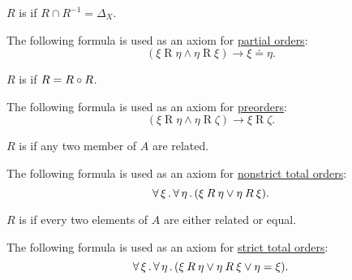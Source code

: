 \begin{definition}
\begin{thmenum}[resume=def:binary_relation]
     \( R \) is  if \( R \cap R^{-1} = \Delta_X \).

    The following formula is used as an axiom for \hyperref[def:partially_ordered_set]{partial orders}:
    \begin{equation}\label{eq:def:binary_relation/antisymmetric}
      (\xi \mathbin{R} \eta \wedge \eta \mathbin{R} \xi) \rightarrow \xi \doteq \eta.
    \end{equation}

     \( R \) is  if \( R = R \mathbin \circ R \).

    The following formula is used as an axiom for \hyperref[def:partially_ordered_set]{preorders}:
    \begin{equation}\label{eq:def:binary_relation/transitive}
      (\xi \mathbin{R} \eta \wedge \eta \mathbin{R} \zeta) \rightarrow \xi \mathbin{R} \zeta.
    \end{equation}

     \( R \) is  if any two member of \( A \) are related.

    The following formula is used as an axiom for \hyperref[def:totally_ordered_set]{nonstrict total orders}:
    \begin{equation}\label{eq:def:binary_relation/total}
      \forall \thinspace \xi \thinspace . \thinspace \forall \thinspace \eta \thinspace . \thinspace (\xi \mathbin{R} \eta \vee \eta \mathbin{R} \xi).
    \end{equation}

     \( R \) is  if every two elements of \( A \) are either related or equal.

    The following formula is used as an axiom for \hyperref[def:totally_ordered_set]{strict total orders}:
    \begin{equation}\label{eq:def:binary_relation/trichotomic}
      \forall \thinspace \xi \thinspace . \thinspace \forall \thinspace \eta \thinspace . \thinspace (\xi \mathbin{R} \eta \vee \eta \mathbin{R} \xi \vee \eta = \xi).
    \end{equation}
  \end{thmenum}
\end{definition}

